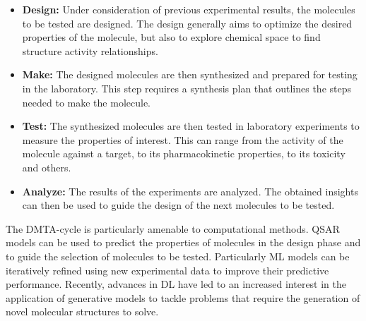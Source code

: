 \begin{itemize}
      \item \textbf{Design:} Under consideration of previous experimental results, the molecules to
            be tested are designed. The design generally aims to optimize the desired properties of
            the molecule, but also to explore chemical space to find structure activity relationships.
      \item \textbf{Make:} The designed molecules are then synthesized and prepared for testing in
            the laboratory. This step requires a synthesis plan that outlines the steps needed to
            make the molecule.
      \item \textbf{Test:} The synthesized molecules are then tested in laboratory experiments to
            measure the properties of interest. This can range from the activity of the molecule
            against a target, to its pharmacokinetic properties, to its toxicity and others.
      \item \textbf{Analyze:} The results of the experiments are analyzed. The obtained insights
            can then be used to guide the design of the next molecules to be tested.
\end{itemize}

The \ac{DMTA}-cycle is particularly amenable to computational methods. \ac{QSAR} models can be used
to predict the properties of molecules in the design phase and to guide the selection of molecules
to be tested. Particularly \ac{ML} models can be iteratively refined using new experimental data to
improve their predictive performance. Recently, advances in \ac{DL} have led to an increased
interest in the application of generative models to tackle problems that require the generation of
novel molecular structures to solve.

